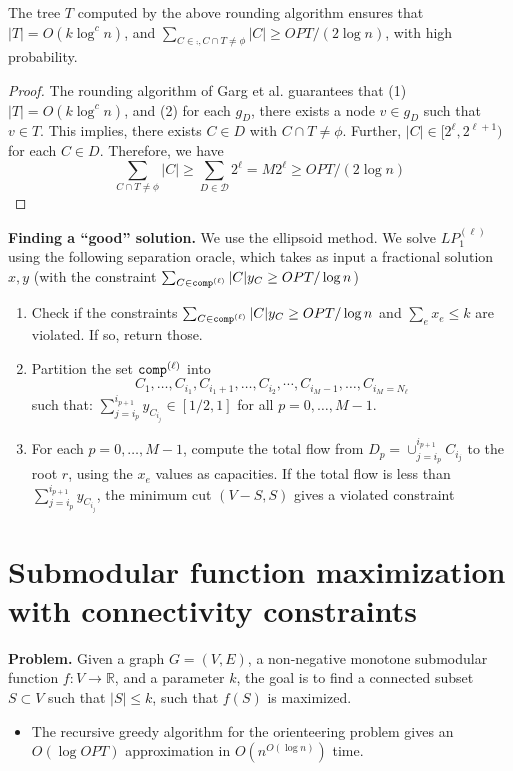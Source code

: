 \begin{lemma}
The tree $T$ computed by the above rounding algorithm ensures that $|T|=O(k\log^c{n})$, and
$\sum_{C\in\comp, C\cap T\neq\phi} |C|\geq OPT/(2\log{n})$, with high probability.
\end{lemma}
\begin{proof}
The rounding algorithm of Garg et al. guarantees that (1) $|T|=O(k\log^c{n})$, and (2) for each $g_D$,
there exists a node $v\in g_D$ such that $v\in T$.
This implies, there exists $C\in D$ with $C\cap T\neq\phi$.
Further, $|C|\in[2^{\ell}, 2^{\ell+1})$ for each $C\in D$.
Therefore, we have 
\[
\sum_{C\cap T\neq\phi} |C| \geq \sum_{D\in\mathcal{D}} 2^{\ell}=M2^{\ell}\geq OPT/(2\log{n})
\]
\end{proof}

\noindent
\textbf{Finding a ``good'' solution.}
We use the ellipsoid method. We solve $LP_1^{(\ell)}$ using the following separation oracle,
which takes as input a fractional solution $x, y$ (with the constraint $\sum_{C\in\texttt{comp}^{(\ell)}} |C|y_C\geq OPT/\log{n}$)
\begin{enumerate}
\item
Check if the constraints $\sum_{C\in\texttt{comp}^{(\ell)}} |C|y_C\geq OPT/\log{n}$ and $\sum_e x_e\leq k$ are violated.
If so, return those.
\item
Partition the set $\texttt{comp}^{(\ell)}$ into
$$C_1,\ldots,C_{i_1},C_{i_1+1},\ldots,C_{i_2},\cdots,C_{i_M-1},\ldots,C_{i_M=N_{\ell}}$$ such that:
$\sum_{j=i_p}^{i_{p+1}} y_{C_{i_j}}\in[1/2, 1]$ for all $p=0,\ldots,M-1$.
\item
For each $p=0,\ldots,M-1$, compute the total flow from $D_p=\cup_{j=i_p}^{i_{p+1}} C_{i_j}$ to the root $r$,
using the $x_e$ values as capacities. If the total flow is less than 
$\sum_{j=i_p}^{i_{p+1}} y_{C_{i_j}}$, the minimum cut $(V-S, S)$ gives a violated constraint
\end{enumerate}


\section{Submodular function maximization with connectivity constraints}

\noindent
\textbf{Problem.}
Given a graph $G=(V, E)$, a non-negative monotone submodular function $f:V\rightarrow\mathbb{R}$, and a parameter $k$, the goal is to find a connected subset $S\subset V$ such that $|S|\leq k$, such that $f(S)$ is maximized.

\begin{itemize}
\item 
The recursive greedy algorithm for the orienteering problem \cite{Chekuri:2005:RGA:1097112.1097461} gives an $O(\log{OPT})$ approximation in  $O(n^{O(\log{n})})$ time.
\end{itemize}